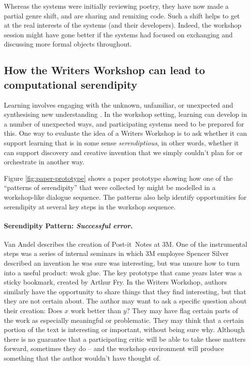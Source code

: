 Whereas the systems were initially reviewing poetry, they have now
made a partial genre shift, and are sharing and remixing code.  Such a
shift helps to get at the real interests of the systems (and their
developers).  Indeed, the workshop session might have gone better if
the systems had focused on exchanging and discussing more formal
objects throughout.


\subsection{How the Writers Workshop can lead to computational serendipity}

Learning involves engaging with the unknown, unfamiliar, or unexpected
and synthesising new understanding \cite{deleuze1994difference}.  In
the workshop setting, learning can develop in a number of unexpected
ways, and participating systems need to be prepared for this.  One way
to evaluate the idea of a Writers Workshop is to ask whether it can
support learning that is in some sense \emph{serendiptious}, in other
words, whether it can support discovery and creative invention that we
simply couldn't plan for or orchestrate in another way.

Figure \ref{fig:paper-prototype} shows a paper prototype showing how
one of the ``patterns of serendipity'' that were collected by
 might be modelled in a workshop-like dialogue sequence.
The patterns also help identify opportunities for serendipity at
several key steps in the workshop sequence.

\paragraph{Serendipity Pattern: \emph{Successful error}.}  Van Andel describes the
creation of Post-it\texttrademark\ Notes at 3M.  One of the
instrumental steps was a series of internal seminars in which 3M
employee Spencer Silver described an invention he was sure was
interesting, but was unsure how to turn into a useful product: weak
glue.  The key prototype that came years later was a sticky bookmark,
created by Arthur Fry.  In the Writers Workshop, authors similarly
have the opportunity to share things that they find interesting, but
that they are not certain about.  The author may want to ask a
specific question about their creation: Does $x$ work better than $y$?
They may have flag certain parts of the work as especially meaningful
or problematic.  They may think that a certain portion of the text is
interesting or important, without being sure why.  Although there is
no guarantee that a participating critic will be able to take these
matters forward, sometimes they do -- and the workshop environment
will produce something that the author wouldn't have thought of.

